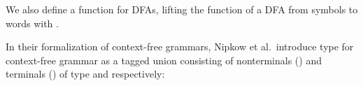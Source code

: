 \begin{isabellebody}
\begin{isamarkuptext}
We also define a  function for DFAs, lifting the  function of a DFA from symbols to 
words with .%
\end{isamarkuptext}\isamarkuptrue%
%
\isadelimdocument
%
\endisadelimdocument
%
\isatagdocument
%
\isamarkuptrue%
%
\endisatagdocument
{\isafolddocument}%
%
\isadelimdocument
%
\endisadelimdocument
%
\begin{isamarkuptext}%
In their formalization of context-free grammars, Nipkow et al.\ introduce type
 for context-free grammar  as a tagged union consisting of
nonterminals () and terminals () of type  and  respectively:
\begin{quote}
\end{quote}


\end{isamarkuptext}
\end{isabellebody}

